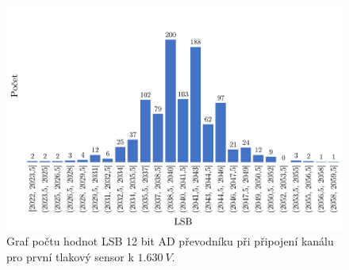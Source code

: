 \begin{figure}[H]
    \caption{Graf počtu hodnot LSB 12 bit AD převodníku při připojení kanálu pro první tlakový sensor k $1.630 \ V$.}
    \label{fig:hist_vacuum1_1_6}
    \includegraphics[width=1\textwidth]{graphs/vacuum1_16.png}

\end{figure}

